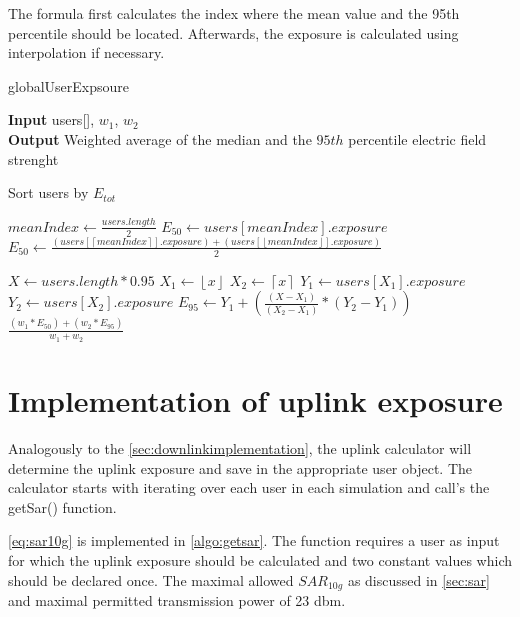 The formula first calculates the index where the mean value and the 95th percentile should be located. Afterwards, the exposure is calculated using interpolation if necessary.

\begin{algorithm}
	\caption{globalUserExpsoure} 
	\label{alg:getglobaluserexposure}
     \hspace*{\algorithmicindent} \textbf{Input} users[], $w_1$, $w_2$\\
     \hspace*{\algorithmicindent} \textbf{Output} Weighted average of the median  and the $95th$ percentile electric field strenght
	\begin{algorithmic}[1]
		\State Sort users by $E_{tot}$
		
		\State $meanIndex \gets \frac{users.length}{2}$
			\State $E_{50} \gets users[meanIndex].exposure$ 
		\Else
			\State $E_{50} \gets \frac{(users[ \left \lceil{meanIndex}\right \rceil ].exposure) + (users[ \left \lfloor{meanIndex}\right \rfloor ].exposure)}{2}$ 
		\EndIf

		\State $ X \gets users.length * 0.95$ 
		\State $ X_1 \gets \left \lfloor{x}\right \rfloor $ 
		\State $ X_2 \gets \left \lceil{x}\right \rceil $ 
		\State $ Y_1 \gets users[X_1].exposure$ 
		\State $ Y_2 \gets users[X_2].exposure$ 
		\State $E_{95} \gets  Y_1 + \left(\frac{(X - X_1)}{(X_2 - X_1)}* (Y_2 - Y_1)\right)$\\
		\Return $\frac{(w_1* E_{50})+ (w_2 * E_{95})}{w_1 + w_2}$
	\end{algorithmic} 
\end{algorithm}

\section{Implementation of uplink exposure}
\label{sec:uplinkexposure}

Analogously to the \ref{sec:downlinkimplementation}, the uplink calculator will determine the uplink exposure and save in the appropriate user object. The calculator starts with iterating over each user in each simulation and call's the getSar() function.

\ref{eq:sar10g} is implemented in \ref{algo:getsar}. The function requires a user as input for which the uplink exposure should be calculated and two constant values which should be declared once. The maximal allowed $SAR_{10g}$ as discussed in \ref{sec:sar} and maximal permitted transmission power of 23 dbm.

